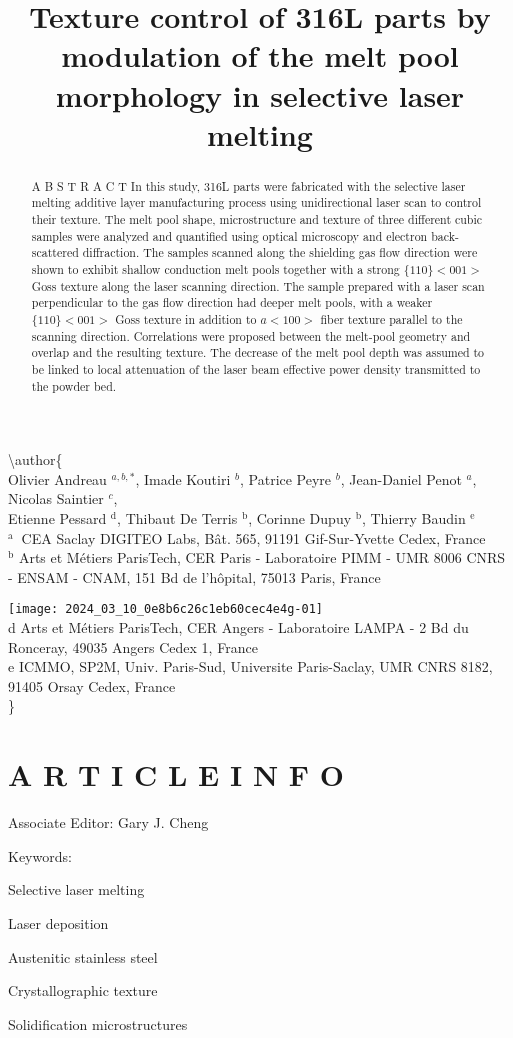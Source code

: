 \documentclass[10pt]{article}
\title{Texture control of 316L parts by modulation of the melt pool morphology in selective laser melting }
\author{}
\date{}
\begin{document}
\maketitle
\textbackslash author\{\\
Olivier Andreau ${ }^{a, b, *}$, Imade Koutiri ${ }^{b}$, Patrice Peyre ${ }^{b}$, Jean-Daniel Penot ${ }^{a}$, Nicolas Saintier ${ }^{c}$, \\
 Etienne Pessard ${ }^{\mathrm{d}}$, Thibaut De Terris ${ }^{\mathrm{b}}$, Corinne Dupuy ${ }^{\mathrm{b}}$, Thierry Baudin ${ }^{\mathrm{e}}$ \\
 ${ }^{\text {a }}$ CEA Saclay DIGITEO Labs, Bât. 565, 91191 Gif-Sur-Yvette Cedex, France \\
 ${ }^{\mathrm{b}}$ Arts et Métiers ParisTech, CER Paris - Laboratoire PIMM - UMR 8006 CNRS - ENSAM - CNAM, 151 Bd de l'hôpital, 75013 Paris, France

\texttt{[image: 2024\_03\_10\_0e8b6c26c1eb60cec4e4g-01]} \\
 d Arts et Métiers ParisTech, CER Angers - Laboratoire LAMPA - 2 Bd du Ronceray, 49035 Angers Cedex 1, France \\
 e ICMMO, SP2M, Univ. Paris-Sud, Universite Paris-Saclay, UMR CNRS 8182, 91405 Orsay Cedex, France\\
\}

\section*{A R T I C L E I N F O}
Associate Editor: Gary J. Cheng

Keywords:

Selective laser melting

Laser deposition

Austenitic stainless steel

Crystallographic texture

Solidification microstructures

\begin{abstract}
A B S T R A C T In this study, 316L parts were fabricated with the selective laser melting additive layer manufacturing process using unidirectional laser scan to control their texture. The melt pool shape, microstructure and texture of three different cubic samples were analyzed and quantified using optical microscopy and electron back-scattered diffraction. The samples scanned along the shielding gas flow direction were shown to exhibit shallow conduction melt pools together with a strong $\{110\}<001>$ Goss texture along the laser scanning direction. The sample prepared with a laser scan perpendicular to the gas flow direction had deeper melt pools, with a weaker $\{110\}<001>$ Goss texture in addition to $a<100>$ fiber texture parallel to the scanning direction. Correlations were proposed between the melt-pool geometry and overlap and the resulting texture. The decrease of the melt pool depth was assumed to be linked to local attenuation of the laser beam effective power density transmitted to the powder bed.
\end{abstract}
\end{document}
